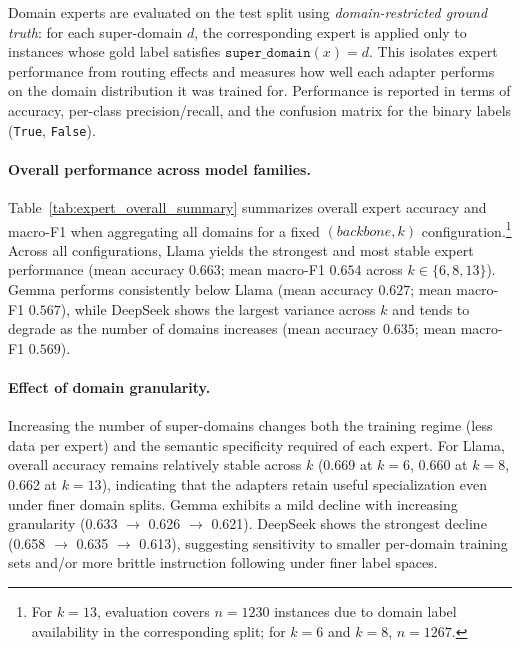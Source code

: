 Domain experts are evaluated on the test split using \emph{domain-restricted ground truth}:
for each super-domain $d$, the corresponding expert is applied only to instances whose
gold label satisfies $\texttt{super\_domain}(x)=d$. This isolates expert performance from
routing effects and measures how well each adapter performs on the domain distribution it
was trained for. Performance is reported in terms of accuracy, per-class precision/recall,
and the confusion matrix for the binary labels (\texttt{True}, \texttt{False}).

\paragraph{Overall performance across model families.}
Table~\ref{tab:expert_overall_summary} summarizes overall expert accuracy and macro-F1 when
aggregating all domains for a fixed $(\textit{backbone},k)$ configuration.\footnote{For
$k{=}13$, evaluation covers $n{=}1230$ instances due to domain label availability in the
corresponding split; for $k{=}6$ and $k{=}8$, $n{=}1267$.}
Across all configurations, Llama yields the strongest and most stable expert performance
(mean accuracy $0.663$; mean macro-F1 $0.654$ across $k\in\{6,8,13\}$). Gemma performs
consistently below Llama (mean accuracy $0.627$; mean macro-F1 $0.567$), while DeepSeek
shows the largest variance across $k$ and tends to degrade as the number of domains
increases (mean accuracy $0.635$; mean macro-F1 $0.569$).

\paragraph{Effect of domain granularity.}
Increasing the number of super-domains changes both the training regime (less data per expert)
and the semantic specificity required of each expert.
For Llama, overall accuracy remains relatively stable across $k$ (0.669 at $k{=}6$,
0.660 at $k{=}8$, 0.662 at $k{=}13$), indicating that the adapters retain useful
specialization even under finer domain splits.
Gemma exhibits a mild decline with increasing granularity (0.633 $\rightarrow$ 0.626
$\rightarrow$ 0.621).
DeepSeek shows the strongest decline (0.658 $\rightarrow$ 0.635 $\rightarrow$ 0.613),
suggesting sensitivity to smaller per-domain training sets and/or more brittle instruction
following under finer label spaces.

